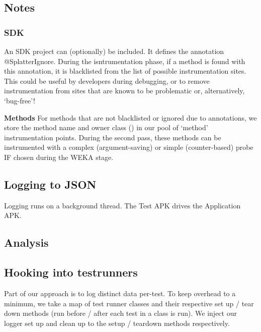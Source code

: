 \subsection{Notes}

\subsubsection{SDK}

An SDK project can (optionally) be included. It defines the annotation @SplatterIgnore. During the isntrumentation phase, if a method is found with this annotation, it is blacklisted from the list of possible instrumentation sites. This could be useful by developers during debugging, or to remove instrumentation from sites that are known to be problematic or, alternatively, {\lq}bug-free{\rq}!

\textbf{Methods}
For methods that are not blacklisted or ignored due to annotations, we store the method name and owner class () in our pool of {\lq}method{\rq} instrumentation points. During the second pass, these methods can be instrumented with a complex (argument-saving) or simple (counter-based) probe IF chosen during the WEKA stage.

\subsection{Logging to JSON}


Logging runs on a background thread. The Test APK drives the Application APK.

\subsection{Analysis}


\subsection{Hooking into testrunners}

Part of our approach is to log distinct data per-test. To keep overhead to a minimum, we take a map of test runner classes and their respective set up / tear down methods (run before / after each test in a class is run). We inject our logger set up and clean up to the setup / teardown methods respectively.

